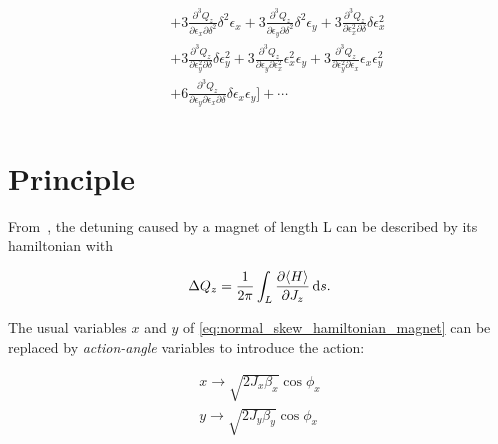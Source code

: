 \begin{equation}
\begin{aligned}
\begin{aligned}
                                             \phantom{+ \frac{1}{3!} \biggl[} 
                                               &+ 3 \frac{\partial^{3} Q_z}{\partial \epsilon_{x}\partial \delta^{2}} \delta^{2} \epsilon_{x} 
                                                + 3  \frac{\partial^{3} Q_z}{\partial \epsilon_{y}\partial \delta^{2}}  \delta^{2} \epsilon_{y}
                                                + 3 \frac{\partial^{3} Q_z}{\partial \epsilon_{x}^{2}\partial \delta}  \delta \epsilon_{x}^{2} \\
                                               &+ 3 \frac{\partial^{3} Q_z}{\partial \epsilon_{y}^{2}\partial \delta} \delta \epsilon_{y}^{2}  
                                                + 3  \frac{\partial^{3} Q_z}{\partial \epsilon_{y}\partial \epsilon_{x}^{2}} \epsilon_{x}^{2} \epsilon_{y} 
                                                + 3 \frac{\partial^{3} Q_z}{\partial \epsilon_{y}^{2}\partial \epsilon_{x}} \epsilon_{x} \epsilon_{y}^{2} \\
                                               &+ 6 \frac{\partial^{3} Q_z}{\partial \epsilon_{y}\partial  \epsilon_{x}\partial \delta} \delta \epsilon_{x} \epsilon_{y} 
                                             \biggr] + \cdots \\
                                             \end{aligned}
\end{aligned}
\end{equation}


\section{Principle}

From~\cite{dilly_derivation_2023}, the detuning caused by a magnet of length L can be described by
its hamiltonian with 

\begin{equation}
  \Delta Q_z = \frac{1}{2 \pi} \int_L \frac{\partial \langle H \rangle}{\partial J_z} \mathop{}\!\mathrm{d} s.
\end{equation}

The usual variables $x$ and $y$ of \cref{eq:normal_skew_hamiltonian_magnet} can be replaced by
\textit{action-angle} variables to introduce the action:

\begin{equation}
  \begin{aligned}
    x \rightarrow \sqrt{2J_x \beta_x} \cos{\phi_x} \\
    y \rightarrow \sqrt{2J_y \beta_y} \cos{\phi_x}
  \end{aligned}
  \label{appendix:chromatic_ampdet:action_angle}
\end{equation}

